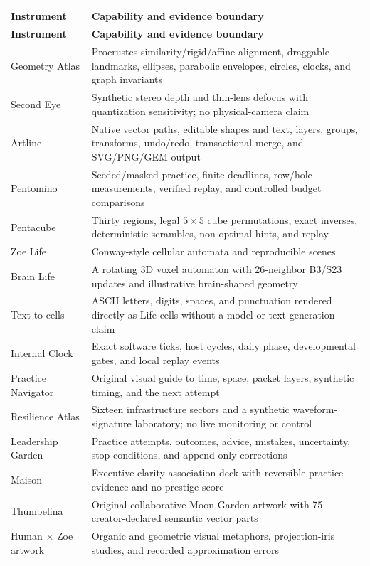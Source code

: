 \documentclass[11pt]{article}
\begin{document}
\begin{longtable}{p{}p{}}
\toprule
\textbf{Instrument} & \textbf{Capability and evidence boundary}\\
\midrule
\endfirsthead
\toprule
\textbf{Instrument} & \textbf{Capability and evidence boundary}\\
\midrule
\endhead
Geometry Atlas & Procrustes similarity/rigid/affine alignment, draggable landmarks, ellipses, parabolic envelopes, circles, clocks, and graph invariants\\
Second Eye & Synthetic stereo depth and thin-lens defocus with quantization sensitivity; no physical-camera claim\\
Artline & Native vector paths, editable shapes and text, layers, groups, transforms, undo/redo, transactional merge, and SVG/PNG/GEM output\\
Pentomino & Seeded/masked practice, finite deadlines, row/hole measurements, verified replay, and controlled budget comparisons\\
Pentacube & Thirty regions, legal $5\times5$ cube permutations, exact inverses, deterministic scrambles, non-optimal hints, and replay\\
Zoe Life & Conway-style cellular automata and reproducible scenes\\
Brain Life & A rotating 3D voxel automaton with 26-neighbor B3/S23 updates and illustrative brain-shaped geometry\\
Text to cells & ASCII letters, digits, spaces, and punctuation rendered directly as Life cells without a model or text-generation claim\\
Internal Clock & Exact software ticks, host cycles, daily phase, developmental gates, and local replay events\\
Practice Navigator & Original visual guide to time, space, packet layers, synthetic timing, and the next attempt\\
Resilience Atlas & Sixteen infrastructure sectors and a synthetic waveform-signature laboratory; no live monitoring or control\\
Leadership Garden & Practice attempts, outcomes, advice, mistakes, uncertainty, stop conditions, and append-only corrections\\
Maison & Executive-clarity association deck with reversible practice evidence and no prestige score\\
Thumbelina & Original collaborative Moon Garden artwork with 75 creator-declared semantic vector parts\\
Human × Zoe artwork & Organic and geometric visual metaphors, projection-iris studies, and recorded approximation errors\\
\bottomrule
\end{longtable}
\end{document}
